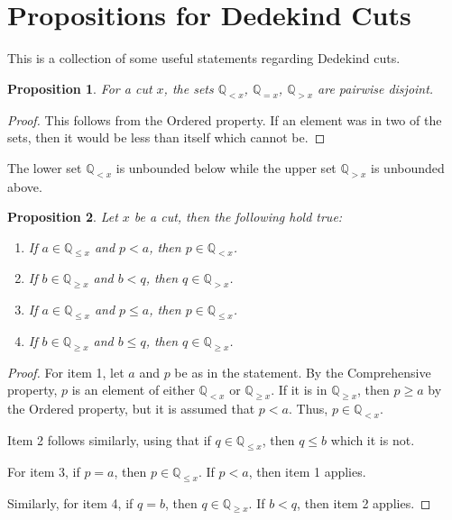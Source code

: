 \documentclass[12pt]{article}
\newtheorem{proposition}{Proposition}[section]
\newcommand{\qcut}[2][x]{\ensuremath{\mathbb{Q}_{#2 #1}}}
\newcommand{\qlt}[1][x]{\qcut[#1]{<}}
\newcommand{\qeq}[1][x]{\qcut[#1]{=}}
\newcommand{\qgt}[1][x]{\qcut[#1]{>}}
\newcommand{\qgeq}[1][x]{\qcut[#1]{\geq}}
\newcommand{\qleq}[1][x]{\qcut[#1]{\leq}}
\begin{document}
\section{Propositions for Dedekind Cuts}

This is a collection of some useful statements regarding Dedekind cuts. 

\begin{proposition}
    For a cut $x$, the sets $\qlt$, $\qeq$, $\qgt$ are pairwise disjoint. 
\end{proposition}

\begin{proof}
    This follows from the Ordered property. If an element was in two of the sets, then it would be less than itself which cannot be. 
\end{proof}

The lower set $\qlt$ is unbounded below while the upper set $\qgt$ is unbounded above. 

\begin{proposition}\label{br:cut-unbounded}
    Let $x$ be a cut, then the following hold true:
    \begin{enumerate}
        \item If $a \in \qleq$ and $p < a$, then $p \in \qlt$. 
        \item If $b \in \qgeq$ and $b < q$, then $q \in \qgt$. 
        \item If $a \in \qleq$ and $p \leq a$, then $p \in \qleq$. 
        \item If $b \in \qgeq$ and $b \leq q$, then $q \in \qgeq$. 
    \end{enumerate}
\end{proposition}

\begin{proof}
    For item 1, let $a$ and $p$ be as in the statement. By the Comprehensive property, $p$ is an element of either $\qlt$ or $\qgeq$. If it is in $\qgeq$, then $p \geq a$ by the Ordered property, but it is assumed that $p < a$. Thus, $p \in \qlt$.

    Item 2 follows similarly, using that if $q \in \qleq$, then $q \leq b$ which it is not. 

    For item 3, if $p = a$, then $p \in \qleq$. If $p < a$, then item 1 applies. 

    Similarly, for item 4, if $q = b$, then $q \in \qgeq$. If $b < q$, then item 2 applies. 

\end{proof}
\end{document}
